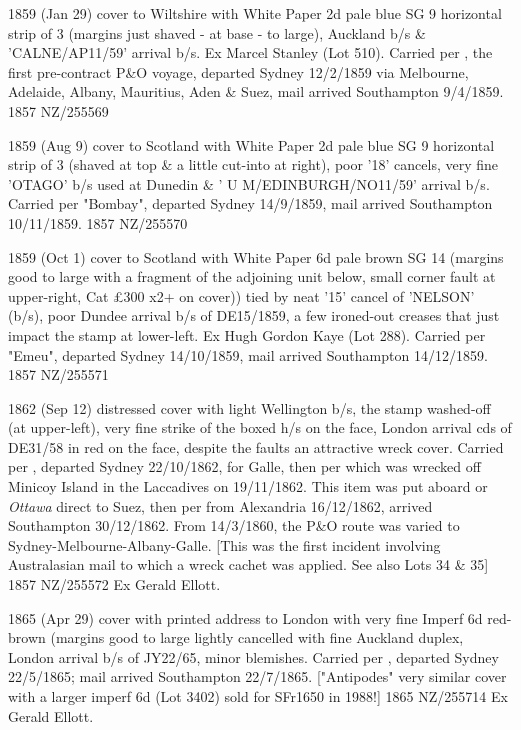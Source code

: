 \documentclass[justified]{tufte-book}
\begin{document}
%
{1859 (Jan 29) cover to Wiltshire with White Paper 2d pale blue SG 9 horizontal strip of 3 (margins just shaved - at base - to large), Auckland b/s \& 'CALNE/AP11/59' arrival b/s. Ex Marcel Stanley (Lot 510). Carried per , the first pre-contract P\&O voyage, departed Sydney 12/2/1859 via Melbourne, Adelaide, Albany, Mauritius, Aden \& Suez, mail arrived Southampton 9/4/1859.}%
{1857}%
{NZ/255569}%
{}%
{}
{}%
{}%

%
{1859 (Aug 9) cover to Scotland with White Paper 2d pale blue SG 9 horizontal strip of 3 (shaved at top \& a little cut-into at right), poor '18' cancels, very fine 'OTAGO' b/s used at Dunedin \& ' U M/EDINBURGH/NO11/59' arrival b/s. Carried per "Bombay", departed Sydney 14/9/1859, mail arrived Southampton 10/11/1859.}%
{1857}%
{NZ/255570}%
{}%
{}
{}%
{}%

%
{1859 (Oct 1) cover to Scotland with White Paper 6d pale brown SG 14 (margins good to large with a fragment of the adjoining unit below, small corner fault at upper-right, Cat £300 x2+ on cover)) tied by neat '15' cancel of 'NELSON' (b/s), poor Dundee arrival b/s of DE15/1859, a few ironed-out creases that just impact the stamp at lower-left. Ex Hugh Gordon Kaye (Lot 288). Carried per "Emeu", departed Sydney 14/10/1859, mail arrived Southampton 14/12/1859.}%
{1857}%
{NZ/255571}%
{}%
{}
{}%
{}%

%
{1862 (Sep 12) distressed cover with light Wellington b/s, the stamp washed-off (at upper-left), very fine strike of the boxed  h/s on the face, London arrival cds of DE31/58 in red on the face, despite the faults an attractive wreck cover. Carried per , departed Sydney 22/10/1862, for Galle, then per  which was wrecked off Minicoy Island in the Laccadives on 19/11/1862. This item was put aboard  or \textit{Ottawa} direct to Suez, then per  from Alexandria 16/12/1862, arrived Southampton 30/12/1862. From 14/3/1860, the P\&O route was varied to Sydney-Melbourne-Albany-Galle. [This was the first incident involving Australasian mail to which a wreck cachet was applied. See also Lots 34 \& 35]}%
{1857}%
{NZ/255572}%
{Ex Gerald Ellott.}%
{}
{}%
{}%

%
{1865 (Apr 29) cover with printed address to London with very fine Imperf 6d red-brown (margins good to large lightly cancelled with fine Auckland duplex, London arrival b/s of JY22/65, minor blemishes. Carried per , departed Sydney 22/5/1865; mail arrived Southampton 22/7/1865. ["Antipodes" very similar cover with a larger imperf 6d (Lot 3402) sold for SFr1650 in 1988!]}%
{1865}%
{NZ/255714}%
{Ex Gerald Ellott.}%
{}
{}%
{}%
\end{document}
